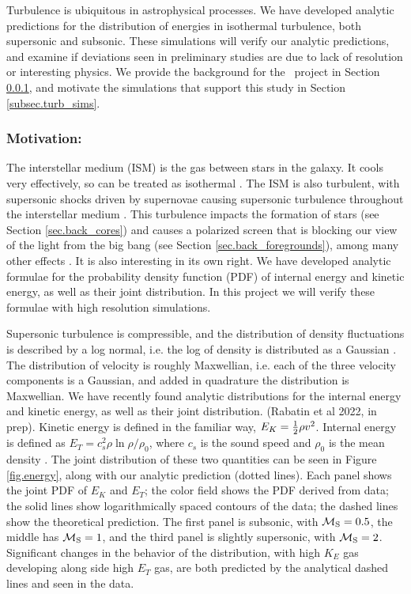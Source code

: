 Turbulence is ubiquitous in astrophysical processes.  We have developed analytic
predictions for the distribution of energies in isothermal turbulence, both
supersonic and subsonic. These simulations will verify our analytic predictions,
and examine if deviations seen in preliminary studies are due to lack of
resolution or interesting physics.
We provide the background for the \nameTurbulence\ project in Section
\ref{subsec.turb_motivate},
and motivate the simulations that support this study in Section
\ref{subsec.turb_sims}.


\subsubsection{Motivation: \nameTurbulence}
\label{subsec.turb_motivate}

The interstellar medium (ISM) is the gas between stars in the galaxy.  It cools
very effectively, so can be treated as isothermal \citep{Krumholz14}.  The ISM is also turbulent, with supersonic shocks driven by supernovae
causing supersonic turbulence throughout the interstellar medium
\citep{Elmegreen04}.  This
turbulence impacts the formation of stars (see Section \ref{sec.back_cores}) and
causes a polarized screen that is blocking our view of the light from the big bang (see
Section \ref{sec.back_foregrounds}), among many other effects
\citep{Elmegreen04}. It is also interesting in its own right.  We have developed
analytic formulae for the probability density function (PDF) of internal energy
and kinetic energy, as well as their joint distribution.  In this project we
will verify these formulae with high resolution simulations.

Supersonic turbulence is compressible, and the distribution of density
fluctuations is described by a log normal, i.e. the log of density is
distributed as a Gaussian \citep{Vazquez-Semadeni94}.  The distribution of velocity is roughly Maxwellian,
i.e. each of the three velocity components is a Gaussian, and added in quadrature the
distribution is Maxwellian.  
We have recently found analytic distributions for the internal energy and
kinetic energy, as well as their joint
distribution.   (Rabatin et al 2022, in prep). Kinetic energy is defined in the familiar way, $E_K=\frac{1}{2} \rho
v^2$.  Internal energy is defined as $E_T= c_s^2 \rho \ln \rho/\rho_0$, where
$c_s$ is the sound speed and $\rho_0$ is the mean density \citep{Banerjee18}.  The joint
distribution of these two quantities can be seen in Figure \ref{fig.energy},
along with our analytic prediction (dotted lines).
Each panel shows the joint PDF of $E_K$ and $E_T$;  the color field shows the
PDF derived from data; the solid lines show logarithmically spaced contours of
the data; the dashed lines show the theoretical prediction.  The first panel is
subsonic, with $\mathcal{M_{\rm{S}}}=0.5$, the middle has $\mathcal{M_{\rm{S}}}=1$, and the third panel is
slightly supersonic, with $\mathcal{M_{\rm{S}}}=2$.  Significant changes in the behavior of the
distribution, with high $K_E$ gas developing along side high $E_T$ gas, are both
predicted by the analytical dashed lines and seen in the data.

